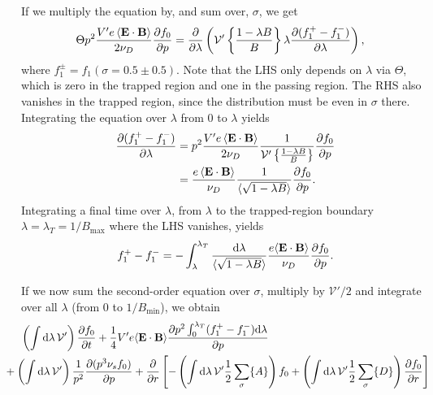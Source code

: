 \documentclass[11pt,a4paper]{article}
\newcommand{\rd}{\ensuremath{\mathrm{d}}}
\newcommand{\sub}[1]{\ensuremath{_{\text{#1}}}}
\renewcommand{\b}[1]{\ensuremath{ {\bf #1 } }}
\begin{document}
If we multiply the equation by, and sum over, $\sigma$, we get
\begin{align}
\Theta  p^2\frac{V'e \left\langle \b{E}\cdot\b{B}\right\rangle}{2\nu_D}\frac{\partial  f_0}{\partial p } &=  \frac{\partial}{\partial \lambda}\left(  \mathcal{V'}\left\{\frac{1-\lambda B}{B}\right\} \lambda\frac{\partial( f_1^+ - f_1^-)}{\partial \lambda}\right), 
\end{align} 
where $f_1^{\pm} = f_1(\sigma = 0.5\pm0.5)$.
Note that the LHS only depends on $\lambda$ via $\Theta$, which is zero in the trapped region and one in the passing region. The RHS also vanishes in the trapped region, since the distribution must be even in $\sigma$ there. Integrating the equation over $\lambda$ from 0 to $\lambda$ yields
\begin{align}
\frac{\partial (f_1^+-f_1^-)}{\partial \lambda} &=  p^2\frac{V'e \left\langle \b{E}\cdot\b{B}\right\rangle}{2\nu_D}\frac{1}{\mathcal{V}' \left\{\frac{1-\lambda B}{B}\right\}}\frac{\partial f_0}{\partial p } \nonumber \\
&= \frac{e \left\langle \b{E}\cdot\b{B}\right\rangle}{\nu_D}\frac{1}{\langle \sqrt{1-\lambda B}\rangle} \frac{\partial f_0}{\partial p}.
\end{align}
Integrating a final time over $\lambda$, from $\lambda$ to the trapped-region boundary $\lambda=\lambda_T = 1/B\sub{max}$ where the LHS vanishes, yields
\begin{align}
f_1^+-f_1^- = -\int_\lambda^{\lambda_T} \frac{\rd \lambda}{\langle\sqrt{1-\lambda B}\rangle} \frac{ e \langle \b{E}\cdot\b{B}\rangle}{\nu_D}\frac{\partial f_0}{\partial p}.
\end{align}

If we now sum the second-order equation over $\sigma$, multiply by $\mathcal{V}'/2$ and integrate over all $\lambda$ (from 0 to $1/B\sub{min}$), we obtain
\begin{align}
\left(\int \rd \lambda \, \mathcal{V}' \right)\frac{\partial f_0}{\partial t} &+\frac{1}{4} V' e\langle \b{E}\cdot\b{B}\rangle \frac{\partial p^2\int_0^{\lambda_T}(f_1^+-f_1^-)\rd\lambda}{\partial p}\nonumber \\
&\hspace{-30mm}+\left(\int \rd \lambda \, \mathcal{V}' \right)\frac{1}{p^2}\frac{\partial(p^3 \nu_s f_0)}{\partial p} +\frac{\partial}{\partial r}\left[ -\left(\int \rd \lambda \, \mathcal{V}' \frac{1}{2}\sum_\sigma\{A\}\right)f_0+  \left(\int \rd \lambda \, \mathcal{V}' \frac{1}{2}\sum_\sigma\{D\}\right)\frac{\partial f_0}{\partial r}\right]
\end{align}
\end{document}

